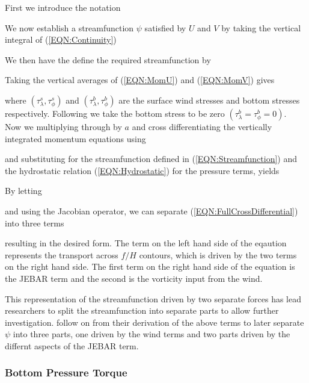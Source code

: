 \documentclass[..\EOYR.tex]{subfiles}
\begin{document}
First we introduce the notation

We now establish a streamfunction $\psi$ satisfied by $U$ and $V$ by taking the vertical integral of (\ref{EQN:Continuity})

We then have the define the required streamfunction by

%
Taking the vertical averages of (\ref{EQN:MomU}) and (\ref{EQN:MomV}) gives


where $\left(\tau_\lambda^s, \tau_\phi^s\right)$ and $\left(\tau_\lambda^b, \tau_\phi^b\right)$ are the surface wind stresses and bottom stresses respectively. Following \citep{Greatbatch1991} we take the bottom stress to be zero $\left(\tau_\lambda^b=\tau_\phi^b=0\right)$.\\

Now we multiplying through by $a$ and cross differentiating the vertically integrated momentum equations using

and substituting for the streamfunction defined in (\ref{EQN:Streamfunction}) and the hydrostatic relation (\ref{EQN:Hydrostatic}) for the pressure terms, yields


By letting

and using the Jacobian operator, we can separate (\ref{EQN:FullCrossDifferential}) into three terms

resulting in the desired form. The term on the left hand side of the eqaution represents the transport across $f/H$ contours, which is driven by the two terms on the right hand side. The first term on the right hand side of the equation is the JEBAR term and the second is the vorticity input from the wind.

This representation of the streamfunction driven by two separate forces has lead researchers to split the streamfunction into separate parts to allow further investigation. \citep{Greatbatch1991} follow on from their derivation of the above terms to later separate $\psi$ into three parts, one driven by the wind terms and two parts driven by the differnt aspects of the JEBAR term. 








\subsubsection{Bottom Pressure Torque}
\end{document}
